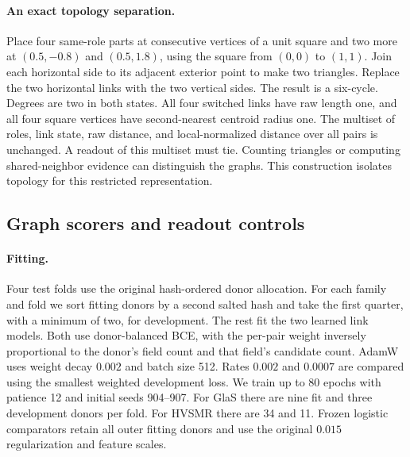 \paragraph{An exact topology separation.}
Place four same-role parts at consecutive vertices of a unit square and two more at $(0.5,-0.8)$ and $(0.5,1.8)$, using the square from $(0,0)$ to $(1,1)$. Join each horizontal side to its adjacent exterior point to make two triangles. Replace the two horizontal links with the two vertical sides. The result is a six-cycle. Degrees are two in both states. All four switched links have raw length one, and all four square vertices have second-nearest centroid radius one. The multiset of roles, link state, raw distance, and local-normalized distance over all pairs is unchanged. A readout of this multiset must tie. Counting triangles or computing shared-neighbor evidence can distinguish the graphs. This construction isolates topology for this restricted representation.

\begin{table}[t]
\centering
\caption{\textbf{Earlier graph ranking and response results.} Source and Edited rank targets by the observed-state anomaly score (geometry uses its fixed readout). Response ranks absolute change in conditional probability or change in the geometry readout. The edited intervals are donor paired. GlaS and HVSMR use 78 and 59 source graphs in the original length tier. The pair MLP and frozen GNN controls keep conditional probability fixed.}
\label{tab:previous_graph}
\scriptsize
\setlength{\tabcolsep}{3.5pt}

\end{table}

\subsection{Graph scorers and readout controls}
\paragraph{Fitting.}
Four test folds use the original hash-ordered donor allocation. For each family and fold we sort fitting donors by a second salted hash and take the first quarter, with a minimum of two, for development. The rest fit the two learned link models. Both use donor-balanced BCE, with the per-pair weight inversely proportional to the donor's field count and that field's candidate count. AdamW uses weight decay $0.002$ and batch size 512. Rates $0.002$ and $0.0007$ are compared using the smallest weighted development loss. We train up to 80 epochs with patience 12 and initial seeds 904--907. For GlaS there are nine fit and three development donors per fold. For HVSMR there are 34 and 11. Frozen logistic comparators retain all outer fitting donors and use the original $0.015$ regularization and feature scales.

